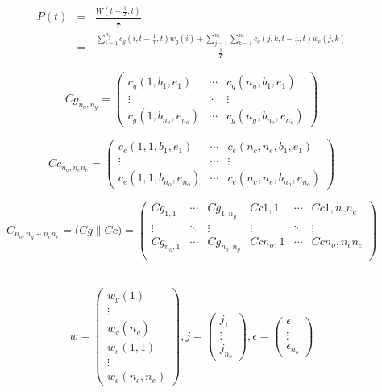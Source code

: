 \begin{eqnarray}
P(t) & = & \frac{W(t - \frac{1}{T}, t)}{\frac{1}{T}} \\
     & = & \frac{\sum\limits_{i=1}^{n_g} c_g(i, t - \frac{1}{T}, t) w_g(i) +
                 \sum\limits_{j=1}^{n_c}
                 \sum\limits_{k=1}^{n_e} c_e(j, k, t - \frac{1}{T}, t) w_e(j, k)
                }{\frac{1}{T}}
\end{eqnarray}


\[
Cg_{n_o,n_g} =
\begin{pmatrix}
c_g(1, b_1, e_1)         & \cdots & c_g(n_g, b_1, e_1)        \\
\vdots                   & \ddots & \vdots                    \\
c_g(1, b_{n_o}, e_{n_o}) & \cdots & c_g(n_g, b_{n_o}, e_{n_o})
\end{pmatrix}
\]

\[
Cc_{n_o,n_cn_e} =
\begin{pmatrix}
c_e(1, 1, b_1, e_1)         & \cdots & c_e(n_c, n_e, b_1, e_1)         \\
\vdots                      & \cdots & \vdots                          \\
c_e(1, 1, b_{n_o}, e_{n_o}) & \cdots & c_e(n_c, n_e, b_{n_o}, e_{n_o})
\end{pmatrix}
\]

\[
C_{n_o,n_g+n_cn_e} = \Bigg( Cg \| Cc \Bigg) =
\begin{pmatrix}
Cg_{1,1}   & \cdots & Cg_{1,n_g}   & Cc{1,1}   & \cdots & Cc{1,n_cn_e} \\
\vdots     & \ddots & \vdots       & \vdots    & \ddots & \vdots       \\
Cg_{n_o,1} & \cdots & Cg_{n_o,n_g} & Cc{n_o,1} & \cdots & Cc{n_o,n_cn_e} \\
\end{pmatrix}
\]

\
\[
w =
\begin{pmatrix}
w_g(1) \\
\vdots \\
w_g(n_g) \\
w_e(1, 1) \\
\vdots \\
w_e(n_c, n_e)
\end{pmatrix}
, j =
\begin{pmatrix}
j_1 \\
\vdots \\
j_{n_o}
\end{pmatrix}
, \epsilon =
\begin{pmatrix}
\epsilon_1 \\
\vdots \\
\epsilon_{n_o}
\end{pmatrix}
\]

